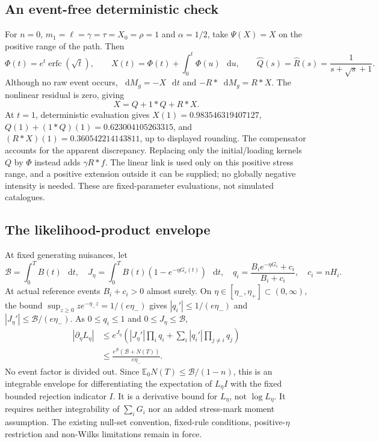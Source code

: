 \documentclass[11pt,a4paper]{article}
\newcommand{\E}{\mathbb{E}}
\newcommand{\dif}{\mathop{}\!\mathrm{d}}
\begin{document}
\subsection{An event-free deterministic check}
For $n=0$, $m_1=\ell=\gamma=\tau=X_0=\rho=1$ and
$\alpha=1/2$, take $\Psi(X)=X$ on the positive range of the path. Then
\[
\Phi(t)=e^t\operatorname{erfc}(\sqrt t),\qquad
X(t)=\Phi(t)+\int_0^t\Phi(u)\,\dif u,\qquad
\widehat Q(s)=\widehat R(s)=\frac1{s+\sqrt s+1}.
\]
Although no raw event occurs, $\dif M_g=-X\,\dif t$ and
$-R*\dif M_g=R*X$. The nonlinear residual is zero, giving
\[
X=Q+1*Q+R*X.
\]
At $t=1$, deterministic evaluation gives $X(1)=0.983546319407127$,
$Q(1)+(1*Q)(1)=0.623004105263315$, and
$(R*X)(1)=0.360542214143811$, up to displayed rounding.
The compensator accounts for the apparent discrepancy. Replacing only
the initial/loading kernels $Q$ by $\Phi$ instead adds $\gamma R*f$.
The linear link is used only on this positive stress range, and a positive
extension outside it can be supplied; no globally negative intensity is
needed. These are fixed-parameter evaluations, not simulated catalogues.

\subsection{The likelihood-product envelope}
At fixed generating nuisances, let
\[
\mathcal B=\int_0^TB(t)\,\dif t,\quad
J_\eta=\int_0^TB(t)(1-e^{-\eta G_s(t)})\,\dif t,\quad
q_i=\frac{B_i e^{-\eta G_i}+c_i}{B_i+c_i},\quad c_i=nH_i.
\]
At actual reference events $B_i+c_i>0$ almost surely. On
$\eta\in[\eta_-,\eta_+]\subset(0,\infty)$, the bound
$\sup_{z\ge0}ze^{-\eta_-z}=1/(e\eta_-)$ gives
$|q_i'|\le1/(e\eta_-)$ and
$|J_\eta'|\le\mathcal B/(e\eta_-)$.
As $0\le q_i\le1$ and $0\le J_\eta\le\mathcal B$,
\[
\begin{aligned}
|\partial_\eta L_\eta|
&\le e^{J_\eta}\left(|J_\eta'|\prod_iq_i+
\sum_i|q_i'|\prod_{j\ne i}q_j\right)\\
&\le\frac{e^{\mathcal B}(\mathcal B+N(T))}{e\eta_-}.
\end{aligned}
\]
No event factor is divided out. Since
$\E _0N(T)\le\mathcal B/(1-n)$, this is an integrable envelope
for differentiating the expectation of $L_\eta I$ with the fixed bounded
rejection indicator $I$. It is a derivative bound for $L_\eta$, not
$\log L_\eta$. It requires neither integrability of $\sum_iG_i$ nor
an added stress-mark moment assumption. The existing null-set convention,
fixed-rule conditions, positive-$\eta$ restriction and non-Wilks limitations
remain in force.
\end{document}
